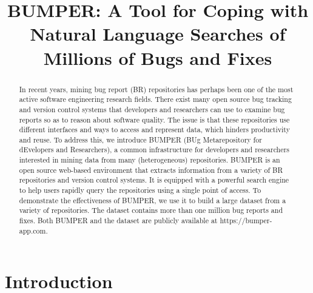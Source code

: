 \documentclass[conference]{IEEEtran}
\begin{document}
\title{BUMPER: A Tool for Coping with Natural Language Searches of Millions of Bugs and Fixes}


\author{
\and
{}

}

\maketitle


\begin{abstract}
In recent years, mining bug report (BR) repositories has perhaps been one of the most active software engineering research fields. There exist many open source bug tracking and version control systems that developers and researchers can use to examine bug reports so as to reason about software quality. The issue is that these repositories use different interfaces and ways to access and represent data, which hinders productivity and reuse. To address this, we introduce BUMPER (BUg Metarepository for dEvelopers and Researchers), a common infrastructure for developers and researchers interested in mining data from many (heterogeneous) repositories. BUMPER is an open source web-based environment that extracts information from a variety of BR repositories and version control systems. It is equipped with a powerful search engine to help users rapidly query the repositories using a single point of access. To demonstrate the effectiveness of BUMPER, we use it to build a large dataset from a variety of repositories. The dataset contains more than one million bug reports and fixes. Both BUMPER and the dataset are publicly available at https://bumper-app.com.

\end{abstract}


\IEEEpeerreviewmaketitle


\section{Introduction}
\end{document}

